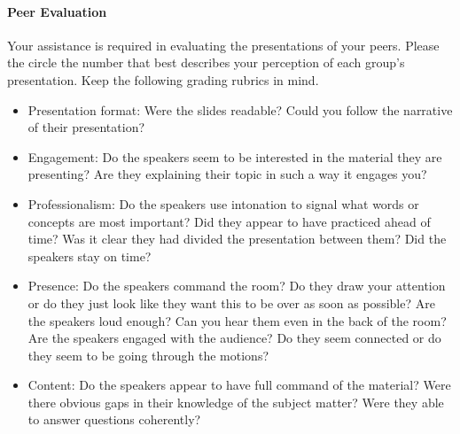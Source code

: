 \documentclass[10pt]{article}
\begin{document}

\newcommand{\grademe}[2]{
\begin{table}[h!]
	\centering
	\begin{tabular}{|l|c|c|c|c|c|p{2.5in}|}
	\hline
	Criteria & Poor & Fair & Average & Good & Excellent & Comments \\
	\hline
	Presentation format 		& 1 & 2 & 3 & 4 & 5 & \\[1.5ex]
	Presentation style 	& 1 & 2 & 3 & 4 & 5 & \\[1.5ex]
	Professionalism	& 1 & 2 & 3 & 4 & 5 & \\[1.5ex]
	Presence 	& 1 & 2 & 3 & 4 & 5 & \\[1.5ex]
	Content 		& 1 & 2 & 3 & 4 & 5 & \\[1.5ex]
	\hline
	\end{tabular}
	\caption{Group #1 - #2}
\end{table}
}


\paragraph{Peer Evaluation}

Your assistance is required in evaluating the presentations of your peers. Please the circle the number that best describes your perception of each group's presentation. Keep the following grading rubrics in mind. 

\begin{itemize}
	\item Presentation format: Were the slides readable? Could you follow the narrative of their presentation?
	\item Engagement: Do the speakers seem to be interested in the material they are presenting? Are they explaining their topic in such a way it engages you?
	\item Professionalism: Do the speakers use intonation to signal what words or concepts are most important? Did they appear to have practiced ahead of time? Was it clear they had divided the presentation between them? Did the speakers stay on time? 
	\item Presence: Do the speakers command the room? Do they draw your attention or do they just look like they want this to be over as soon as possible? Are the speakers loud enough? Can you hear them even in the back of the room?  Are the speakers engaged with the audience? Do they seem connected or do they seem to be going through the motions?	
	\item Content: Do the speakers appear to have full command of the material? Were there obvious gaps in their knowledge of the subject matter? Were they able to answer questions coherently? 
\end{itemize}
\end{document}
